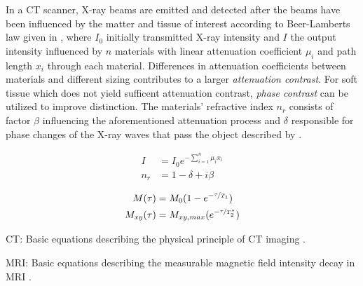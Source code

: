         In a \ac{CT} scanner, X-ray beams are emitted and detected after the beams have been influenced by the matter and tissue of interest according to Beer-Lamberts law given in , where $I_0$ initially transmitted X-ray intensity and $I$ the output intensity influenced by $n$ materials with linear attenuation coefficient $\mu_i$ and path length $x_i$ through each material. Differences in attenuation coefficients between materials and different sizing contributes to a larger \emph{attenuation contrast}. For soft tissue which does not yield sufficent attenuation contrast, \emph{phase contrast} can be utilized to improve distinction.
        The materials' refractive index $n_r$ consists of factor $\beta$ influencing the aforementioned attenuation process and $\delta$ responsible for phase changes of the X-ray waves that pass the object described by  \citep{withers2021x}.

        \begin{minipage}[b]{.45\textwidth}
            \begin{align}
                I &= I_0 e^{-\sum_{i=1}^{n} \mu_i x_i} \label{eq:beer_lambert} \\
                n_r &= 1-\delta + i\beta \label{eq:refractive_index}
            \end{align}
        \end{minipage}
        \hfill
        \begin{minipage}[b]{.45\textwidth}
            \begin{align}
                M(\tau) &= M_0(1-e^{-\nicefrac{\tau}{T_1}}) \label{eq:T1decay}\\
                M_{xy}(\tau) &= M_{xy,max}(e^{-\nicefrac{\tau}{T_2^*}})\label{eq:T2decay}
            \end{align}
        \end{minipage}
        \vspace{6pt}

        \begin{minipage}[b]{.45\textwidth}
            \ac{CT}: Basic equations describing the physical principle of \ac{CT} imaging \citep{withers2021x}.
        \end{minipage}
        \hfill
        \begin{minipage}[b]{.45\textwidth}
            \ac{MRI}: Basic equations describing the measurable magnetic field intensity decay in \ac{MRI} \citep{dale2015mri}.
        \end{minipage}
        \vspace{12pt}

